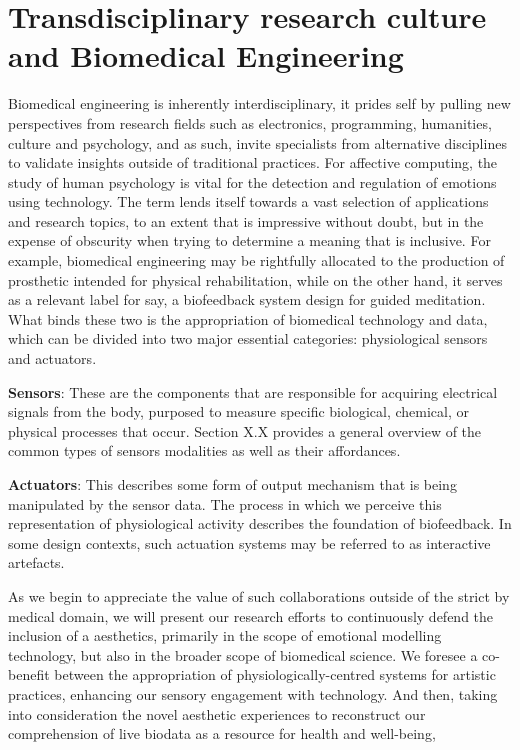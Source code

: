 \section{Transdisciplinary research culture and Biomedical Engineering}

Biomedical engineering is inherently interdisciplinary, it prides self by pulling new perspectives from research fields such as electronics, programming, humanities, culture and psychology, and as such, invite specialists from alternative disciplines to validate insights outside of traditional practices. For affective computing, the study of human psychology is vital for the detection and regulation of emotions using technology. The term lends itself towards a vast selection of applications and research topics, to an extent that is impressive without doubt, but in the expense of obscurity when trying to determine a meaning that is inclusive. For example, biomedical engineering may be rightfully allocated to the production of prosthetic intended for physical rehabilitation, while on the other hand, it serves as a relevant label for say, a biofeedback system design for guided meditation. What binds these two is the appropriation of biomedical technology and data, which can be divided into two major essential categories: physiological sensors and actuators.

\textbf{Sensors}: These are the components that are responsible for acquiring electrical signals from the body, purposed to measure specific biological, chemical, or physical processes that occur. Section X.X provides a general overview of the common types of sensors modalities as well as their affordances.

\textbf{Actuators}: This describes some form of output mechanism that is being manipulated by the sensor data. The process in which we perceive this representation of physiological activity describes the foundation of biofeedback. In some design contexts, such actuation systems may be referred to as interactive artefacts.

As we begin to appreciate the value of such collaborations outside of the strict by medical domain, we will present our research efforts to continuously defend the inclusion of a aesthetics, primarily in the scope of emotional modelling technology, but also in the broader scope of biomedical science. We foresee a co-benefit between the appropriation of physiologically-centred systems for artistic practices, enhancing our sensory engagement with technology. And then, taking into consideration the novel aesthetic experiences to reconstruct our comprehension of live biodata as a resource for health and well-being, 

